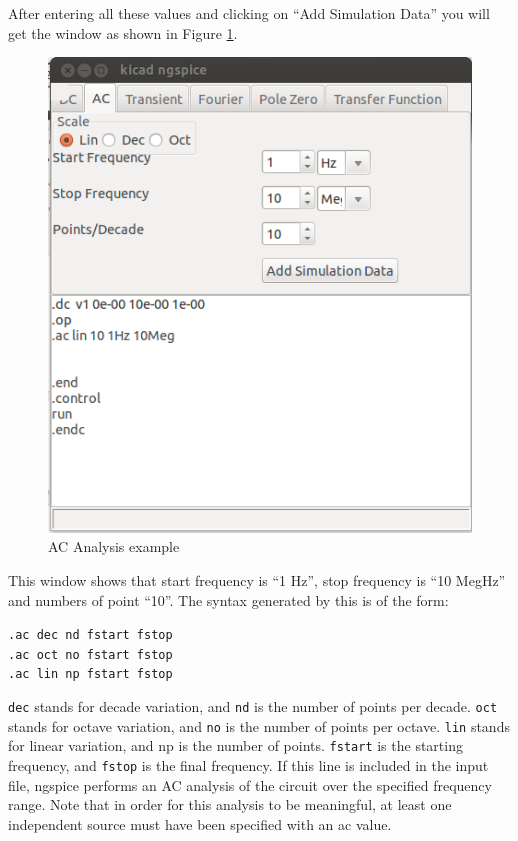 After entering all these values and clicking on “Add Simulation Data” you will get the window as shown in Figure \ref{5}.
\begin{figure}
\centering
\includegraphics[width=\textwidth]{figures/5}
\caption{AC Analysis example}
\label{5}
\end{figure}
This window shows that start frequency is “1 Hz”, stop frequency is “10 MegHz” and  numbers of point “10”.
The syntax generated by this is of the form: 

{\tt .ac dec nd fstart fstop }\\
{\tt .ac oct no fstart fstop }\\
{\tt .ac lin np fstart fstop }

{\tt dec} stands for decade variation, and {\tt nd} is the number of points per decade. {\tt oct} stands for octave variation, and {\tt no} is the number of points per octave. {\tt lin} stands for linear variation, and np is the number of points. {\tt fstart} is the starting frequency, and {\tt fstop} is the final frequency. If this line is included in the input file, ngspice performs an AC analysis of the circuit over the specified frequency range. Note that in order for this analysis to be meaningful, at least one independent source must have been specified with an ac value.
